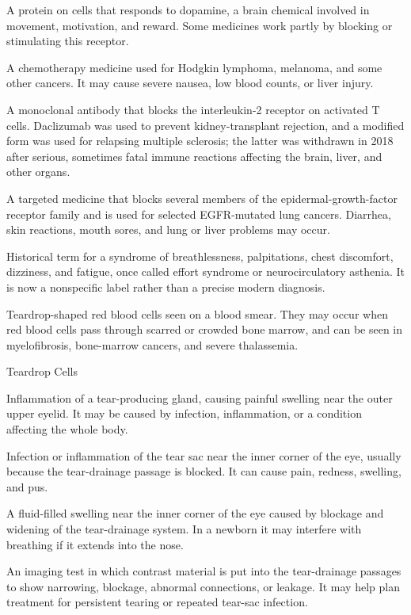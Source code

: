  A protein on cells that responds to dopamine, a brain chemical involved in movement, motivation, and reward. Some medicines work partly by blocking or stimulating this receptor.

 A chemotherapy medicine used for Hodgkin lymphoma, melanoma, and some other cancers. It may cause severe nausea, low blood counts, or liver injury.

 A monoclonal antibody that blocks the interleukin-2 receptor on activated T cells. Daclizumab was used to prevent kidney-transplant rejection, and a modified form was used for relapsing multiple sclerosis; the latter was withdrawn in 2018 after serious, sometimes fatal immune reactions affecting the brain, liver, and other organs.

 A targeted medicine that blocks several members of the epidermal-growth-factor receptor family and is used for selected EGFR-mutated lung cancers. Diarrhea, skin reactions, mouth sores, and lung or liver problems may occur.

 Historical term for a syndrome of breathlessness, palpitations, chest discomfort, dizziness, and fatigue, once called effort syndrome or neurocirculatory asthenia. It is now a nonspecific label rather than a precise modern diagnosis.

 Teardrop-shaped red blood cells seen on a blood smear. They may occur when red blood cells pass through scarred or crowded bone marrow, and can be seen in myelofibrosis, bone-marrow cancers, and severe thalassemia.

\synonyms
Teardrop Cells

 Inflammation of a tear-producing gland, causing painful swelling near the outer upper eyelid. It may be caused by infection, inflammation, or a condition affecting the whole body.

 Infection or inflammation of the tear sac near the inner corner of the eye, usually because the tear-drainage passage is blocked. It can cause pain, redness, swelling, and pus.

 A fluid-filled swelling near the inner corner of the eye caused by blockage and widening of the tear-drainage system. In a newborn it may interfere with breathing if it extends into the nose.

 An imaging test in which contrast material is put into the tear-drainage passages to show narrowing, blockage, abnormal connections, or leakage. It may help plan treatment for persistent tearing or repeated tear-sac infection.

